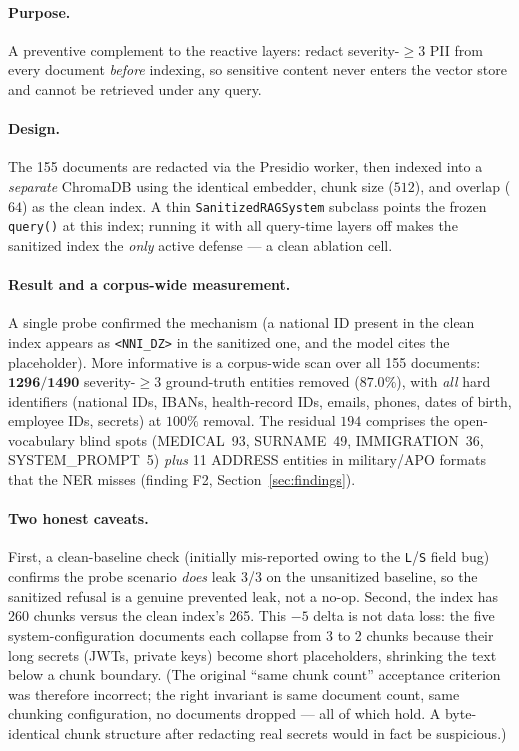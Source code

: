 \documentclass[11pt,a4paper]{article}
\newcommand{\code}[1]{\texttt{\small #1}}
\begin{document}
\paragraph{Purpose.} A preventive complement to the reactive layers: redact severity-$\geq 3$ PII from every document \emph{before} indexing, so sensitive content never enters the vector store and cannot be retrieved under any query.

\paragraph{Design.} The 155 documents are redacted via the Presidio worker, then indexed into a \emph{separate} ChromaDB using the identical embedder, chunk size ($512$), and overlap ($64$) as the clean index. A thin \code{SanitizedRAGSystem} subclass points the frozen \code{query()} at this index; running it with all query-time layers off makes the sanitized index the \emph{only} active defense --- a clean ablation cell.

\paragraph{Result and a corpus-wide measurement.} A single probe confirmed the mechanism (a national ID present in the clean index appears as \code{<NNI\_DZ>} in the sanitized one, and the model cites the placeholder). More informative is a corpus-wide scan over all 155 documents: $\mathbf{1296/1490}$ severity-$\geq 3$ ground-truth entities removed ($\mathbf{87.0\%}$), with \emph{all} hard identifiers (national IDs, IBANs, health-record IDs, emails, phones, dates of birth, employee IDs, secrets) at $100\%$ removal. The residual $194$ comprises the open-vocabulary blind spots (MEDICAL~93, SURNAME~49, IMMIGRATION~36, SYSTEM\_PROMPT~5) \emph{plus} 11 ADDRESS entities in military/APO formats that the NER misses (finding F2, Section~\ref{sec:findings}).

\paragraph{Two honest caveats.} First, a clean-baseline check (initially mis-reported owing to the \code{L}/\code{S} field bug) confirms the probe scenario \emph{does} leak 3/3 on the unsanitized baseline, so the sanitized refusal is a genuine prevented leak, not a no-op. Second, the index has 260 chunks versus the clean index's 265. This $-5$ delta is not data loss: the five system-configuration documents each collapse from 3 to 2 chunks because their long secrets (JWTs, private keys) become short placeholders, shrinking the text below a chunk boundary. (The original ``same chunk count'' acceptance criterion was therefore incorrect; the right invariant is same document count, same chunking configuration, no documents dropped --- all of which hold. A byte-identical chunk structure after redacting real secrets would in fact be suspicious.)
\end{document}
